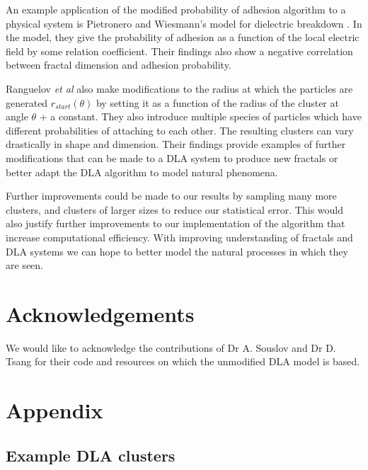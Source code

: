 \documentclass[10pt, twocolumn]{article} %
\begin{document}
  An example application of the modified probability of adhesion algorithm to a physical system is Pietronero and Wiesmann's model for dielectric breakdown \cite{Pietronero_1984}. In the model, they give the probability of adhesion as a function of the local electric field by some relation coefficient. Their findings also show a negative correlation between fractal dimension and adhesion probability.

  Ranguelov \textit{et al} also make modifications to the radius at which the particles are generated $r_{start}(\theta)$ by setting it as a function of the radius of the cluster at angle $\theta$ + a constant. They also introduce multiple species of particles which have different probabilities of attaching to each other. The resulting clusters can vary drastically in shape and dimension. Their findings provide examples of further modifications that can be made to a DLA system to produce new fractals or better adapt the DLA algorithm to model natural phenomena.

  Further improvements could be made to our results by sampling many more clusters, and clusters of larger sizes to reduce our statistical error. This would also justify further improvements to our implementation of the algorithm that increase computational efficiency. With improving understanding of fractals and DLA systems we can hope to better model the natural processes in which they are seen.

\section*{Acknowledgements}
We would like to acknowledge the contributions of Dr A. Souslov and Dr D. Tsang for their code and resources on which the unmodified DLA model is based.




\clearpage

\onecolumn

\section*{Appendix}

\subsection*{Example DLA clusters}
\end{document}
